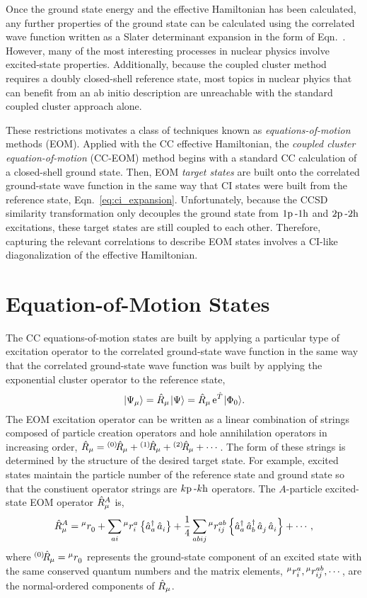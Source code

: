 \documentclass[thesis.tex]{subfiles}
\begin{document}
Once the ground state energy and the effective Hamiltonian has been calculated, any further properties of the ground state can be calculated using the correlated wave function written as a Slater determinant expansion in the form of Eqn.\ \cite{eq:cc_ansatz}.  However, many of the most interesting processes in nuclear physics involve excited-state properties.  Additionally, because the coupled cluster method requires a doubly closed-shell reference state, most topics in nuclear phyics that can benefit from an ab initio description are unreachable with the standard coupled cluster approach alone.

These restrictions motivates a class of techniques known as \textit{equations-of-motion} methods (EOM).  Applied with the CC effective Hamiltonian, the \textit{coupled cluster equation-of-motion} (CC-EOM) method begins with a standard CC calculation of a closed-shell ground state.  Then, EOM \textit{target states} are built onto the correlated ground-state wave function in the same way that CI states were built from the reference state, Eqn.\ \eqref{eq:ci_expansion}.  Unfortunately, because the CCSD similarity transformation only decouples the ground state from $1\mathrm{p}\hspace{2pt}\text{-}1\mathrm{h}$ and $2\mathrm{p}\hspace{2pt}\text{-}2\mathrm{h}$ excitations, these target states are still coupled to each other.  Therefore, capturing the relevant correlations to describe EOM states involves a CI-like diagonalization of the effective Hamiltonian.


\section{Equation-of-Motion States} \label{section:eom_target_states}

The CC equations-of-motion states are built by applying a particular type of excitation operator to the correlated ground-state wave function in the same way that the correlated ground-state wave function was built by applying the exponential cluster operator to the reference state,
\begin{equation}\label{eq:eom_def}
  \hspace{1pt}\lvert \Psi_{\mu} \rangle = \hat{R}\hspace{-0.1pt}_{\mu}\hspace{1pt}\lvert \Psi \rangle = \hat{R}\hspace{-0.1pt}_{\mu}\operatorname{e}^{\hat{T}\hspace{-0.25pt}}\hspace{1pt}\lvert \Phi_{0} \rangle.
\end{equation}
The EOM excitation operator can be written as a linear combination of strings composed of particle creation operators and hole annihilation operators in increasing order, $\hat{R}\hspace{-0.1pt}_{\mu} = {}^{\left(0\right)}\hspace{-2pt}\hat{R}\hspace{-0.5pt}_{\mu} + {}^{\left(1\right)}\hspace{-2pt}\hat{R}\hspace{-0.5pt}_{\mu} + {}^{\left(2\right)}\hspace{-2pt}\hat{R}\hspace{-0.5pt}_{\mu} + \cdots$.  The form of these strings is determined by the structure of the desired target state.  For example, excited states maintain the particle number of the reference state and ground state so that the constiuent operator strings are $k\mathrm{p}\hspace{2pt}\text{-}k\mathrm{h}$ operators.  The $A$-particle excited-state EOM operator $\hat{R}\hspace{-0.1pt}^{A}_{\mu}$ is,
\begin{equation}
  \hat{R}\hspace{-0.1pt}^{A}_{\mu} = {}^{\mu}r^{}_{0} + \sum_{ai}{}^{\mu}r^{a}_{i}\left\{\mathop{\hat{a}^{\dagger}_{a}}\mathop{\hat{a}^{}_{i}}\right\} + \frac{1}{4}\sum_{abij}{}^{\mu}r^{ab}_{ij}\left\{\mathop{\hat{a}^{\dagger}_{a}}\mathop{\hat{a}^{\dagger}_{b}}\mathop{\hat{a}^{}_{j}}\mathop{\hat{a}^{}_{i}}\right\} + \cdots,
\end{equation}
where ${}^{\left(0\right)}\hspace{-2pt}\hat{R}\hspace{-0.5pt}_{\mu} = {}^{\mu}r^{}_{0}$ represents the ground-state component of an excited state with the same conserved quantum numbers and the matrix elements, ${}^{\mu}r^{a}_{i}, {}^{\mu}r^{ab}_{ij}, \cdots$, are the normal-ordered components of $\hat{R}\hspace{-0.1pt}_{\mu}$.
\end{document}
